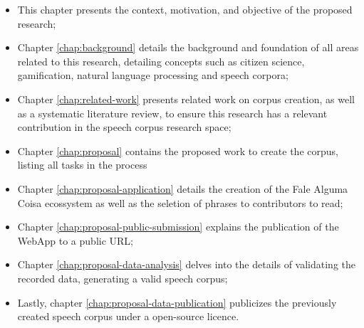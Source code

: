 \begin{itemize}
    \item This chapter presents the context, motivation, and objective of the proposed research;
    \item Chapter \ref{chap:background} details the background and foundation of all areas related to this research, detailing concepts such as citizen science, gamification, natural language processing and speech corpora;
    \item Chapter \ref{chap:related-work} presents related work on corpus creation, as well as a systematic literature review, to ensure this research has a relevant contribution in the speech corpus research space;
    \item Chapter \ref{chap:proposal} contains the proposed work to create the corpus, listing all tasks in the process
    \item Chapter \ref{chap:proposal-application} details the creation of the Fale Alguma Coisa ecossystem as well as the seletion of phrases to contributors to read;
    \item Chapter \ref{chap:proposal-public-submission} explains the publication of the WebApp to a public URL;
    \item Chapter \ref{chap:proposal-data-analysis} delves into the details of validating the recorded data, generating a valid speech corpus;
    \item Lastly, chapter \ref{chap:proposal-data-publication} publicizes the previously created speech corpus under a open-source licence.
\end{itemize}
